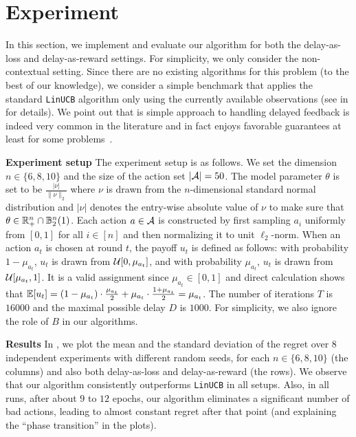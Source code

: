 \section{Experiment}\label{sec: experiment}


In this section, we implement and evaluate our algorithm for both the delay-as-loss and delay-as-reward settings.
For simplicity, we only consider the non-contextual setting.
Since there are no existing algorithms for this problem (to the best of our knowledge), 
we consider a simple benchmark that applies the standard \texttt{LinUCB} algorithm only using the currently available observations (see  in  for details).
We point out that is simple approach to handling delayed feedback is indeed very common in the literature and in fact enjoys favorable guarantees at least for some problems~\citep{thune2019nonstochastic,van2023unified}.

\textbf{Experiment setup} The experiment setup is as follows. We set the dimension $n\in\{6,8,10\}$ and the size of the action set $|{\mathcal{A}}|=50$. The model parameter $\theta$ is set to be $\frac{|\nu|}{\|\nu\|_2}$ where $\nu$ is drawn from the $n$-dimensional standard normal distribution and $|\nu|$ denotes the entry-wise absolute value of $\nu$ to make sure that $\theta\in \mathbb{R}_+^n\cap \mathbb{B}_2^n(1)$. Each action $a\in {\mathcal{A}}$ is constructed by first sampling $a_i$ uniformly from $[0,1]$ for all $i\in [n]$ and then normalizing it to unit $\ell_2$-norm. When an action $a_t$ is chosen at round $t$, the payoff $u_t$ is defined as follows: with probability $1-\mu_{a_t}$, $u_t$ is drawn from ${\mathcal{U}}[0,\mu_{a_t}]$, and with probability $\mu_{a_t}$, $u_t$ is drawn from ${\mathcal{U}}[\mu_{a_t},1]$. It is a valid assignment since $\mu_{a_t}\in[0,1]$ and direct calculation shows that $\mathbb{E}[u_t]=(1-\mu_{a_t})\cdot \frac{\mu_{a_t}}{2}+\mu_{a_t}\cdot\frac{1+\mu_{a_t}}{2}=\mu_{a_t}$.
The number of iterations $T$ is $16000$ and the maximal possible delay $D$ is $1000$.
For simplicity, we also ignore the role of $B$ in our algorithms.

\textbf{Results} 
In , we plot the mean and the standard deviation of the regret over $8$ independent experiments with different random seeds, for each $n\in\{6,8,10\}$ (the columns) and also both delay-as-loss and delay-as-reward (the rows).
We observe that our algorithm consistently outperforms \texttt{LinUCB} in all setups. 
Also, in all runs, after about $9$ to $12$ epochs, our algorithm eliminates a significant number of bad actions, leading to almost constant regret after that point (and explaining the ``phase transition'' in the plots).
